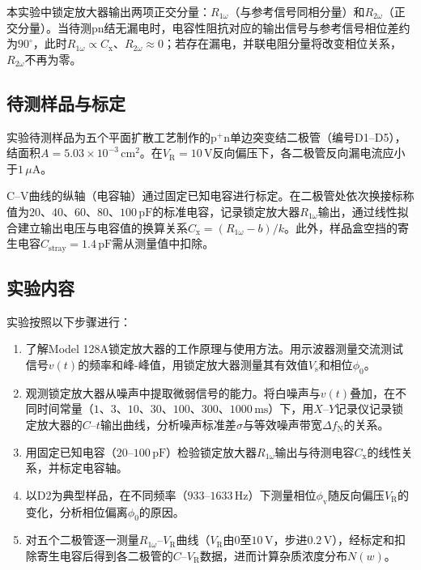 本实验中锁定放大器输出两项正交分量：$R_{1\omega}$（与参考信号同相分量）和$R_{2\omega}$（正交分量）。当待测pn结无漏电时，电容性阻抗对应的输出信号与参考信号相位差约为$90^{\circ}$，此时$R_{1\omega} \propto C_{\mathrm{x}}$、$R_{2\omega} \approx 0$；若存在漏电，并联电阻分量将改变相位关系，$R_{2\omega}$不再为零。

\subsection{待测样品与标定}

实验待测样品为五个平面扩散工艺制作的$\mathrm{p}^+\mathrm{n}$单边突变结二极管（编号D1--D5），结面积$A = 5.03 \times 10^{-3}\,\mathrm{cm}^{2}$。在$V_{\mathrm{R}} = 10\,\mathrm{V}$反向偏压下，各二极管反向漏电流应小于$1\,\mu\mathrm{A}$。

C--V曲线的纵轴（电容轴）通过固定已知电容进行标定。在二极管处依次换接标称值为$20$、$40$、$60$、$80$、$100\,\mathrm{pF}$的标准电容，记录锁定放大器$R_{1\omega}$输出，通过线性拟合建立输出电压与电容值的换算关系$C_{\mathrm{x}} = (R_{1\omega} - b)/k$。此外，样品盒空挡的寄生电容$C_{\mathrm{stray}} = 1.4\,\mathrm{pF}$需从测量值中扣除。

\subsection{实验内容}

实验按照以下步骤进行：

\begin{enumerate}
  \item 了解Model 128A锁定放大器的工作原理与使用方法。用示波器测量交流测试信号$v(t)$的频率和峰-峰值，用锁定放大器测量其有效值$V_{\mathrm{s}}$和相位$\phi_{0}$。
  \item 观测锁定放大器从噪声中提取微弱信号的能力。将白噪声与$v(t)$叠加，在不同时间常量（$1$、$3$、$10$、$30$、$100$、$300$、$1000\,\mathrm{ms}$）下，用$X$--$Y$记录仪记录锁定放大器的$C$--$t$输出曲线，分析噪声标准差$\sigma$与等效噪声带宽$\Delta f_{\mathrm{N}}$的关系。
  \item 用固定已知电容（$20$--$100\,\mathrm{pF}$）检验锁定放大器$R_{1\omega}$输出与待测电容$C_{\mathrm{x}}$的线性关系，并标定电容轴。
  \item 以D2为典型样品，在不同频率（$933$--$1633\,\mathrm{Hz}$）下测量相位$\phi_{\mathrm{v}}$随反向偏压$V_{\mathrm{R}}$的变化，分析相位偏离$\phi_{0}$的原因。
  \item 对五个二极管逐一测量$R_{1\omega}$--$V_{\mathrm{R}}$曲线（$V_{\mathrm{R}}$由$0$至$10\,\mathrm{V}$，步进$0.2\,\mathrm{V}$），经标定和扣除寄生电容后得到各二极管的$C$--$V_{\mathrm{R}}$数据，进而计算杂质浓度分布$N(w)$。
\end{enumerate}
